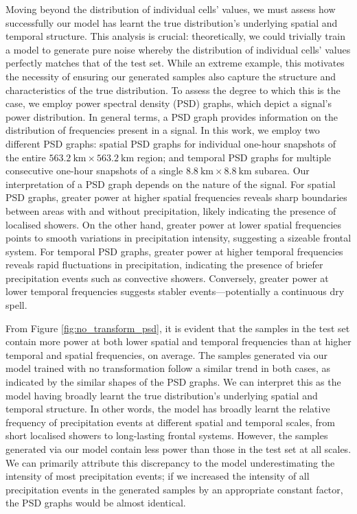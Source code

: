 \documentclass[ oneside,%
                    author={George Herbert},
                    degree={MSci},
                     title={Video Diffusion Models for Climate Simulations},
                  subtitle={}]{dissertation}
\begin{document}
Moving beyond the distribution of individual cells' values, we must assess how successfully our model has learnt the true distribution's underlying spatial and temporal structure. This analysis is crucial: theoretically, we could trivially train a model to generate pure noise whereby the distribution of individual cells' values perfectly matches that of the test set. While an extreme example, this motivates the necessity of ensuring our generated samples also capture the structure and characteristics of the true distribution. To assess the degree to which this is the case, we employ power spectral density (PSD) graphs, which depict a signal's power distribution. In general terms, a PSD graph provides information on the distribution of frequencies present in a signal. In this work, we employ two different PSD graphs: spatial PSD graphs for individual one-hour snapshots of the entire $563.2\ \mathrm{km}\times 563.2\ \mathrm{km}$ region; and temporal PSD graphs for multiple consecutive one-hour snapshots of a single $8.8\ \mathrm{km}\times 8.8\ \mathrm{km}$ subarea. Our interpretation of a PSD graph depends on the nature of the signal. For spatial PSD graphs, greater power at higher spatial frequencies reveals sharp boundaries between areas with and without precipitation, likely indicating the presence of localised showers. On the other hand, greater power at lower spatial frequencies points to smooth variations in precipitation intensity, suggesting a sizeable frontal system. For temporal PSD graphs, greater power at higher temporal frequencies reveals rapid fluctuations in precipitation, indicating the presence of briefer precipitation events such as convective showers. Conversely, greater power at lower temporal frequencies suggests stabler events---potentially a continuous dry spell. 

From Figure \ref{fig:no_transform_psd}, it is evident that the samples in the test set contain more power at both lower spatial and temporal frequencies than at higher temporal and spatial frequencies, on average. The samples generated via our model trained with no transformation follow a similar trend in both cases, as indicated by the similar shapes of the PSD graphs. We can interpret this as the model having broadly learnt the true distribution's underlying spatial and temporal structure. In other words, the model has broadly learnt the relative frequency of precipitation events at different spatial and temporal scales, from short localised showers to long-lasting frontal systems. However, the samples generated via our model contain less power than those in the test set at all scales. We can primarily attribute this discrepancy to the model underestimating the intensity of most precipitation events; if we increased the intensity of all precipitation events in the generated samples by an appropriate constant factor, the PSD graphs would be almost identical.
\end{document}
